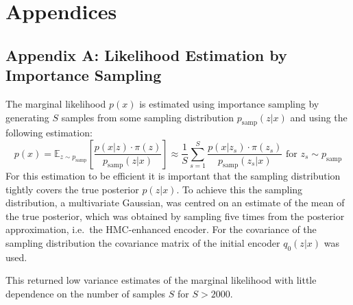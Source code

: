 \documentclass[12pt]{scrartcl}
\newcommand{\E}{\mathbb{E}}
\begin{document}



\section{Appendices}
\subsection{Appendix A: Likelihood Estimation by Importance Sampling}
\label{app:NLLestimateImportSampling}

The marginal likelihood $p(x)$ is estimated using importance sampling by generating $S$ samples from some sampling distribution $p_\textrm{samp}(z|x)$ and using the following estimation:
\begin{equation}
p(x) = \E_{z \sim p_\textrm{samp}} \left[\frac{p(x|z) \cdot \pi(z)}{p_\textrm{samp}(z|x)} \right] \approx \frac{1}{S} \sum_{s=1}^S \frac{p(x|z_s) \cdot \pi(z_s)}{p_\textrm{samp}(z_s|x)} \textrm{ for } z_s \sim p_\textrm{samp}
\end{equation}
For this estimation to be efficient it is important that the sampling distribution tightly covers the true posterior $p(z|x)$. To achieve this the sampling distribution, a multivariate Gaussian, was centred on an estimate of the mean of the true posterior, which was obtained by sampling five times from the posterior approximation, i.e.\ the HMC-enhanced encoder. For the covariance of the sampling distribution the covariance matrix of the initial encoder $q_0(z|x)$ was used.

This returned low variance estimates of the marginal likelihood with little dependence on the number of samples $S$ for $S > 2000$.

\end{document}
